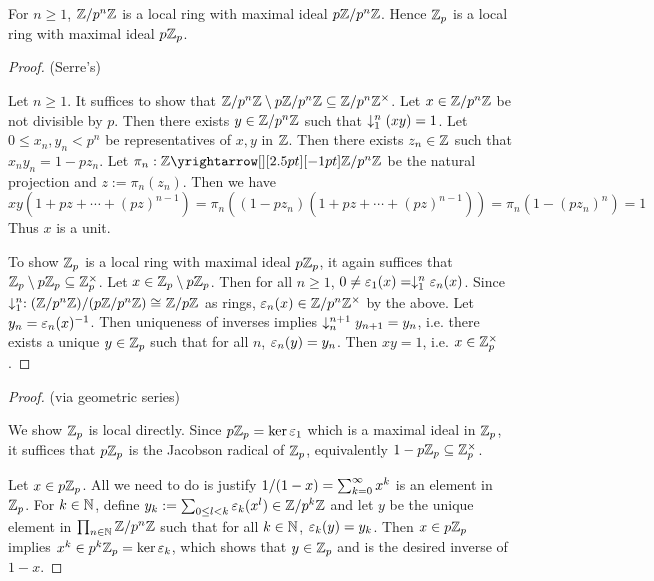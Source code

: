 \begin{prop}
  
  For $n \geq 1$, $\mathbb{Z}/p^n\mathbb{Z}$ is a local ring with maximal ideal $p\mathbb{Z}/p^n\mathbb{Z}$. 
  Hence $\mathbb{Z}_p$ is a local ring with maximal ideal $p\mathbb{Z}_p$. 
\end{prop}
\begin{proof}(Serre's)

  Let $n \geq 1$. 
  It suffices to show that $\mathbb{Z}/p^n\mathbb{Z} \setminus p\mathbb{Z}/p^n\mathbb{Z} \subseteq \mathbb{Z}/p^n\mathbb{Z}^\times$. 
  Let $x \in \mathbb{Z}/p^n\mathbb{Z}$ be not divisible by $p$. 
  Then there exists $y \in \mathbb{Z}/p^n\mathbb{Z}$ such that $\downarrow_{1}^{n} (x y) = 1$.
  Let $0 \leq x_n, y_n < p^n$ be representatives of $x, y$ in $\mathbb{Z}$. 
  Then there exists $z_n \in \mathbb{Z}$ such that $x_n y_n = 1 - p z_n$. 
  Let $\pi_n : \map{\Z}{\Z/p^n\Z}{}{}$ be the natural projection and 
  $z := \pi_n(z_n)$. 
  Then we have \[
    x y (1 + p z + \cdots + (pz)^{n-1})
    = \pi_n((1 - p z_n)(1 + p z + \cdots + (pz)^{n-1}))
    = \pi_n(1 - (p z_n)^n)
    = 1 
  \]
  Thus $x$ is a unit. 

  To show $\mathbb{Z}_p$ is a local ring with maximal ideal $p\mathbb{Z}_p$, 
  it again suffices that $\mathbb{Z}_p\setminus p\mathbb{Z}_p \subseteq \mathbb{Z}_p^\times$. 
  Let $x \in \mathbb{Z}_p\setminus p\mathbb{Z}_p$. 
  Then for all $n \geq 1$, $0 \neq \varepsilon_1(x) = \downarrow_{1}^{n}\varepsilon_n(x)$. 
  Since $\downarrow_{1}^{n} : (\mathbb{Z}/p^n\mathbb{Z}) / (p\mathbb{Z}/p^n\mathbb{Z}) \cong_{} \mathbb{Z}/p\mathbb{Z}$ as rings, 
  $\varepsilon_n(x) \in \mathbb{Z}/p^n\mathbb{Z}^\times$ by the above. 
  Let $y_n = \varepsilon_n(x)^{-1}$. 
  Then uniqueness of inverses implies $\downarrow_{n}^{n+1} y_{n+1} = y_n$,
  i.e. there exists a unique $y \in \mathbb{Z}_p$ such that 
  for all $n$, $\varepsilon_n(y) = y_n$.
  Then $x y = 1$, i.e. $x \in \mathbb{Z}_p^\times$. 
\end{proof}
\begin{proof}(via geometric series)

  We show $\mathbb{Z}_p$ is local directly. 
  Since $p\mathbb{Z}_p = \ker \varepsilon_1$ which is a maximal ideal in $\mathbb{Z}_p$, 
  it suffices that $p\mathbb{Z}_p$ is the Jacobson radical of $\mathbb{Z}_p$,
  equivalently $1 - p\mathbb{Z}_p \subseteq \mathbb{Z}_p^\times$. 

  Let $x \in p\mathbb{Z}_p$. 
  All we need to do is justify $1/(1 - x) = \sum_{k = 0}^{\infty} x^k$
  is an element in $\mathbb{Z}_p$. 
  For $k \in \mathbb{N}$, define $y_k := \sum_{0 \leq l < k}^{} \varepsilon_k(x^l) \in \mathbb{Z}/p^k\mathbb{Z}$
  and let $y$ be the unique element in $\prod_{n \in \mathbb{N}}^{}\mathbb{Z}/p^n\mathbb{Z}$ such that 
  for all $k \in \mathbb{N}$, $\varepsilon_k(y) = y_k$. 
  Then $x \in p\mathbb{Z}_p$ implies $x^k \in p^k\mathbb{Z}_p = \ker \varepsilon_k$, 
  which shows that $y \in \mathbb{Z}_p$ and is the desired inverse of $1 - x$. 
\end{proof}

